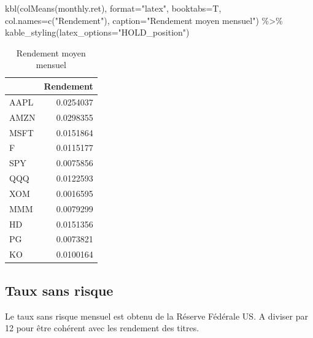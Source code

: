 \documentclass[
]{article}
\newenvironment{Shaded}{\begin{snugshade}}{\end{snugshade}}
\newcommand{\AttributeTok}[1]{\textcolor[rgb]{0.77,0.63,0.00}{#1}}
\newcommand{\FunctionTok}[1]{\textcolor[rgb]{0.00,0.00,0.00}{#1}}
\newcommand{\NormalTok}[1]{#1}
\newcommand{\SpecialCharTok}[1]{\textcolor[rgb]{0.00,0.00,0.00}{#1}}
\newcommand{\StringTok}[1]{\textcolor[rgb]{0.31,0.60,0.02}{#1}}
\begin{document}
\begin{Shaded}
\begin{Highlighting}[]
\FunctionTok{kbl}\NormalTok{(}\FunctionTok{colMeans}\NormalTok{(monthly.ret), }\AttributeTok{format=}\StringTok{"latex"}\NormalTok{, }\AttributeTok{booktabs=}\NormalTok{T, }
    \AttributeTok{col.names=}\FunctionTok{c}\NormalTok{(}\StringTok{"Rendement"}\NormalTok{), }\AttributeTok{caption=}\StringTok{"Rendement moyen mensuel"}\NormalTok{) }\SpecialCharTok{\%\textgreater{}\%}
    \FunctionTok{kable\_styling}\NormalTok{(}\AttributeTok{latex\_options=}\StringTok{"HOLD\_position"}\NormalTok{)}
\end{Highlighting}
\end{Shaded}

\begin{table}[H]

\caption{\label{tab:unnamed-chunk-3}Rendement moyen mensuel}
\centering
\begin{tabular}[t]{lr}
\toprule
  & Rendement\\
\midrule
AAPL & 0.0254037\\
AMZN & 0.0298355\\
MSFT & 0.0151864\\
F & 0.0115177\\
SPY & 0.0075856\\
\addlinespace
QQQ & 0.0122593\\
XOM & 0.0016595\\
MMM & 0.0079299\\
HD & 0.0151356\\
PG & 0.0073821\\
\addlinespace
KO & 0.0100164\\
\bottomrule
\end{tabular}
\end{table}

\hypertarget{taux-sans-risque}{%
\subsection{Taux sans risque}\label{taux-sans-risque}}

Le taux sans risque mensuel est obtenu de la Réserve Fédérale US. A
diviser par 12 pour être cohérent avec les rendement des titres.
\end{document}
